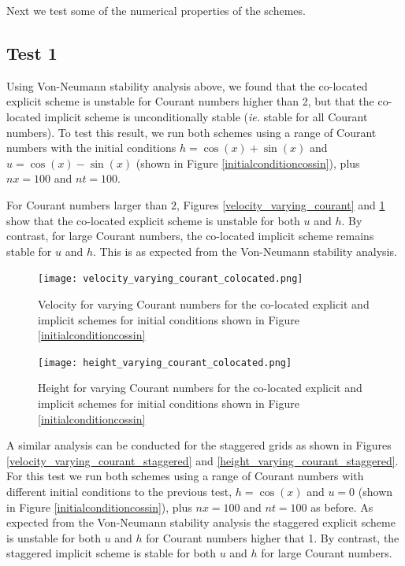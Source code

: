 \documentclass[a4paper, 10.8pt, notitlepage]{article}
\begin{document}
Next we test some of the numerical properties of the schemes.
\subsection{Test 1}
Using Von-Neumann stability analysis above, we found that the co-located explicit scheme is unstable for Courant numbers higher than 2, but that the co-located implicit scheme is unconditionally stable (\textit{ie.} stable for all Courant numbers). To test this result, we run both schemes using a range of Courant numbers with the initial conditions $h = \cos(x) + \sin(x)$ and $u = \cos(x) -\sin(x)$ (shown in Figure \ref{initialconditioncossin}), plus $nx = 100$ and $nt = 100$.

For Courant numbers larger than $2$, Figures \ref{velocity_varying_courant} and \ref{height_varying_courant} show that the co-located explicit scheme is unstable for both $u$ and $h$. By contrast, for large Courant numbers, the co-located implicit scheme remains stable for $u$ and $h$. This is as expected from the Von-Neumann stability analysis.

\begin{figure}[H]
	\begin{minipage}{.5\textwidth}
		\ContinuedFloat*
		\captionsetup{width=0.95\textwidth}
		\captionsetup{justification=centering}
		\texttt{[image: velocity\_varying\_courant\_colocated.png]}
		\caption{\label{velocity_varying_courant} Velocity for varying Courant numbers for the co-located explicit and implicit schemes for initial conditions shown in Figure \ref{initialconditioncossin}}
	\end{minipage}
	\begin{minipage}{.5\textwidth}
	\ContinuedFloat
	\captionsetup{width=0.95\textwidth}
	\captionsetup{justification=centering}
	\texttt{[image: height\_varying\_courant\_colocated.png]}
	\caption{\label{height_varying_courant} Height for varying Courant numbers for the co-located explicit and implicit schemes for initial conditions shown in Figure \ref{initialconditioncossin}} 
\end{minipage}
\end{figure}

A similar analysis can be conducted for the staggered grids as shown in Figures \ref{velocity_varying_courant_staggered} and \ref{height_varying_courant_staggered}. For this test we run both schemes using a range of Courant numbers with different initial conditions to the previous test, $h = \cos(x)$ and $u = 0$ (shown in Figure \ref{initialconditioncossin}), plus $nx = 100$ and $nt = 100$ as before. As expected from the Von-Neumann stability analysis the staggered explicit scheme is unstable for both $u$ and $h$ for Courant numbers higher that 1. By contrast, the staggered implicit scheme is stable for both $u$ and $h$ for large Courant numbers.
\end{document}
